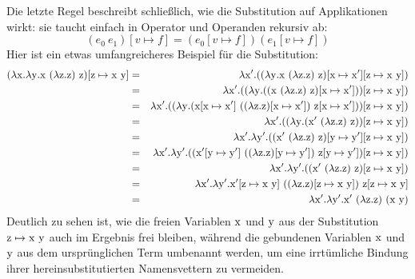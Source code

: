 Die letzte Regel beschreibt schließlich, wie die Substitution auf
Applikationen wirkt: sie taucht einfach in Operator und Operanden
rekursiv ab:
%
\begin{displaymath}
      (e_0~e_1)[v\mapsto f] = (e_0[v\mapsto f])(e_1[v\mapsto f])
\end{displaymath}
%
Hier ist ein etwas umfangreicheres Beispiel für die Substitution:
%
\begin{eqnarray*}
  (\lambda \mathrm x.\lambda \mathrm y.\mathrm x~(\lambda \mathrm z.\mathrm z)~\mathrm z)[\mathrm z \mapsto \mathrm x~\mathrm y]
  &=&
  \lambda \mathrm x'.((\lambda \mathrm y.\mathrm x~(\lambda \mathrm z.\mathrm z)~\mathrm z)[\mathrm x\mapsto \mathrm x'][\mathrm z \mapsto \mathrm x~\mathrm y])
  \\ &=&
  \lambda \mathrm x'.((\lambda \mathrm y.((\mathrm x~(\lambda \mathrm z.\mathrm z)~\mathrm z)[\mathrm x\mapsto \mathrm x']))[\mathrm z \mapsto \mathrm x~\mathrm y])
  \\ &=&
  \lambda \mathrm x'.((\lambda \mathrm y.(\mathrm x[\mathrm x\mapsto \mathrm x']~((\lambda \mathrm z.\mathrm z)[\mathrm x\mapsto \mathrm x'])~\mathrm z[\mathrm x\mapsto \mathrm x']))[\mathrm z \mapsto \mathrm x~\mathrm y])
  \\ &=&
  \lambda \mathrm x'.((\lambda \mathrm y.(\mathrm x'~(\lambda \mathrm z.\mathrm z)~\mathrm z))[\mathrm z \mapsto \mathrm x~\mathrm y])
  \\ &=&
  \lambda \mathrm x'.\lambda \mathrm y'.((\mathrm x'~(\lambda \mathrm z.\mathrm z)~\mathrm z)[\mathrm y \mapsto \mathrm y'][\mathrm z \mapsto \mathrm x~\mathrm y])
  \\ &=&
  \lambda \mathrm x'.\lambda \mathrm y'.((\mathrm x'[\mathrm y \mapsto \mathrm y']~((\lambda \mathrm z.\mathrm z)[\mathrm y \mapsto \mathrm y'])~\mathrm z[\mathrm y \mapsto \mathrm y'])[\mathrm z \mapsto \mathrm x~\mathrm y])
  \\ &=&
  \lambda \mathrm x'.\lambda \mathrm y'.((\mathrm x'~(\lambda \mathrm z.\mathrm z)~\mathrm z)[\mathrm z \mapsto \mathrm x~\mathrm y])
  \\ &=&
  \lambda \mathrm x'.\lambda \mathrm y'.\mathrm x'[\mathrm z \mapsto \mathrm x~\mathrm y]~((\lambda \mathrm z.\mathrm z)[\mathrm z \mapsto \mathrm x~\mathrm y])~\mathrm z[\mathrm z \mapsto \mathrm x~\mathrm y]
  \\ &=&
  \lambda \mathrm x'.\lambda \mathrm y'.\mathrm x'~(\lambda \mathrm z.\mathrm z)~(\mathrm x~\mathrm y)
\end{eqnarray*}
%
Deutlich zu sehen ist, wie die freien Variablen $\mathrm x$ und $\mathrm y$ aus der
Substitution $\mathrm z\mapsto \mathrm x~\mathrm y$ auch im Ergebnis frei bleiben, während die
gebundenen Variablen $\mathrm x$ und $\mathrm y$ aus dem ursprünglichen Term umbenannt
werden, um eine irrtümliche Bindung ihrer hereinsubstitutierten
Namensvettern zu vermeiden.

